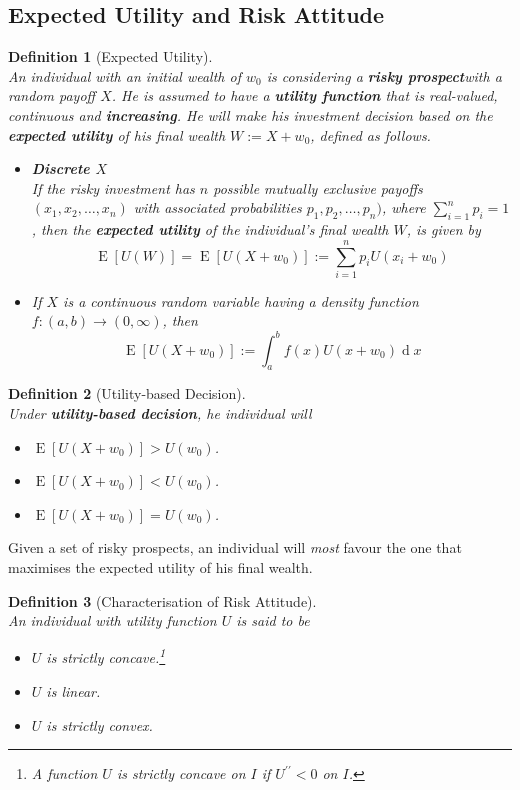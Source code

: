 \documentclass[12pt]{article}
\newtheorem{definition}{Definition}[section]
\theoremstyle{definition}
\DeclareMathOperator{\diff}{d}
\DeclareMathOperator{\expec}{E}
\begin{document}
\subsection{Expected Utility and Risk Attitude}
\begin{definition}[Expected Utility]
\hfill\\\normalfont An individual with an initial wealth of $w_0$ is considering a \textbf{risky prospect}with a random payoff $X$. He is assumed to have a \textbf{utility function} that is real-valued, continuous and \textbf{increasing}. He will make his investment decision based on the \textbf{expected utility} of his final wealth $W:=X+w_0$, defined as follows.
\begin{itemize}
  \item \textbf{Discrete $X$}\\If the risky investment has $n$ possible mutually exclusive payoffs $(x_1,x_2,\ldots, x_n)$ with associated probabilities $p_1,p_2,\ldots, p_n)$, where $\sum_{i=1}^n p_i = 1$, then the \textbf{expected utility} of the individual's final wealth $W$, is given by
  \[
\expec[ U (W)]=\expec[ U (X+w_0)] := \sum_{i=1}^n p_i U (x_i+w_0)
  \]
\item If $X$ is a continuous random variable having a density function $f:(a,b)\to(0,\infty)$, then
\[
\expec[ U (X+w_0)]:=\int_a^b f(x) U (x+w_0)\diff x
\]
\end{itemize}
\end{definition}
\begin{definition}[Utility-based Decision]\hfill\\\normalfont
Under \textbf{utility-based decision}, he individual will
\begin{itemize}
  \item {}$\expec[ U (X+w_0)]> U (w_0)$.
  \item {}$\expec[ U (X+w_0)]< U (w_0)$.
    \item {}$\expec[ U (X+w_0)]= U (w_0)$.
  \end{itemize}
  \end{definition}
Given a set of risky prospects, an individual will \textit{most} favour the one that maximises the expected utility of his final wealth.
\begin{definition}[Characterisation of Risk Attitude]\hfill\\\normalfont
An individual with utility function $U$ is said to be
\begin{itemize}
  \item {}$U$ is strictly concave.\footnote{A function $U$ is strictly concave on $I$ if $U^{\prime\prime}<0$ on $I$.}
  \item {}$U$ is linear.
  \item {}$U$ is strictly convex.
\end{itemize}
\end{definition}
\end{document}

